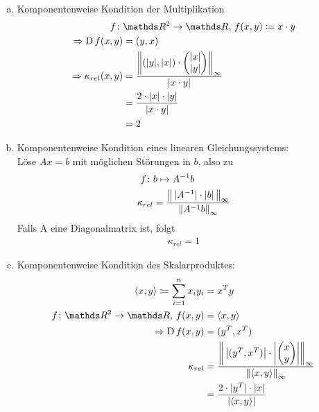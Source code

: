 \begin{Bspe}~
  \begin{enumerate}[a)]
  \item Komponentenweise Kondition der Multiplikation
    \begin{align*}
      f\colon &\R^2 \rightarrow \R, \, f(x,y) \coloneqq x\cdot y \\
      \Rightarrow \D f(x,y) &= (y, x)  \\
      \Rightarrow \kappa_{rel}(x,y) &= \frac{\left\| (|y|, |x|)\cdot \begin{pmatrix}
            |x| \\
            |y|
          \end{pmatrix}\right\|_\infty}
      {|x\cdot y|} \\
              &= \frac{2\cdot|x|\cdot |y|}{|x\cdot y|} \\
              &= 2
    \end{align*}
  \item Komponentenweise Kondition eines linearen Gleichungssystems:\\
    Löse $Ax=b$ mit möglichen Störungen in $b$, also zu
    \begin{align*}
      f\colon & b\mapsto A^{-1}b \\
      \kappa_{rel} & = \frac{\nn[ \, |A^{-1}| \cdot |b|\, ]_\infty}{\nn[A^{-1}b]_\infty}
    \end{align*}
    Falls A eine Diagonalmatrix ist, folgt
    \begin{gather*}
      \kappa_{rel}=1
    \end{gather*}
  \item Komponentenweise Kondition des Skalarproduktes:
    \begin{align*}
      \langle x,y \rangle \coloneqq \sum_{i=1}^{n}x_i y_i& = x^Ty \\
      f\colon\R^2 \rightarrow \R, \, f(x,y) &= \langle x,y \rangle \\
      \Rightarrow \D f(x,y) &= (y^T, x^T) \\
      \kappa_{rel}  &= \frac{\left\| \,\left|(y^T, x^T)\right|\cdot\left|\begin{pmatrix}
              x \\
              y
            \end{pmatrix}\right|\right\|_\infty }
      {\nn[\langle x,y\rangle]_\infty}\\
                                                         &= \frac{2\cdot |y^T|\cdot |x|}{|\langle x,y\rangle|} \\

\end{align*}
\end{enumerate}
\end{Bspe}

